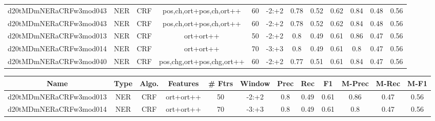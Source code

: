 \documentclass[a4paper]{article}
\begin{document}
\begin{landscape}
\begin{center}
\begin{tabular}{ |c|c|c|c|c|c|c|c|c|c|c|c|}
 	
 
 	
 		
 		\small{ d20tMDmNERaCRFw3mod043 } & NER & CRF & pos,ch,ort+pos,ch,ort++  &  60 &  -2:+2  &  0.78 & 0.52 & 0.62  &  0.84 & 0.48 & 0.56 \\
 		

 	
 
 	
 		
 		\small{ d20tMDmNERaCRFw3mod043 } & NER & CRF & pos,ch,ort+pos,ch,ort++  &  60 &  -2:+2  &  0.78 & 0.52 & 0.62  &  0.84 & 0.48 & 0.56 \\
 		

 	
 
 	
 		
 		\small{ d20tMDmNERaCRFw3mod013 } & NER & CRF & ort+ort++  &  50 &  -2:+2  &  0.8 & 0.49 & 0.61  &  0.86 & 0.47 & 0.56 \\
 		

 	
 
 	
 		
 		\small{ d20tMDmNERaCRFw3mod014 } & NER & CRF & ort+ort++  &  70 &  -3:+3  &  0.8 & 0.49 & 0.61  &  0.8 & 0.47 & 0.56 \\
 		

 	
 
 	
 		
 		\small{ d20tMDmNERaCRFw3mod040 } & NER & CRF & pos,chg,ort+pos,chg,ort++  &  60 &  -2:+2  &  0.77 & 0.51 & 0.61  &  0.84 & 0.47 & 0.56 \\
 		
 \hline
\end{tabular}
\end{center}




\begin{center}
\begin{tabular}{ |c|c|c|c|c|c|c|c|c|c|c|c|} 
 \hline
 	Name & Type & Algo. & Features & \# Ftrs & Window & Prec & Rec & F1 & M-Prec & M-Rec & M-F1\\
 \hline

 		

 	
 
 	
 		
 		\small{ d20tMDmNERaCRFw3mod013 } & NER & CRF & ort+ort++  &  50 &  -2:+2  &  0.8 & 0.49 & 0.61  &  0.86 & 0.47 & 0.56 \\
 		

 	
 
 	
 		
 		\small{ d20tMDmNERaCRFw3mod014 } & NER & CRF & ort+ort++  &  70 &  -3:+3  &  0.8 & 0.49 & 0.61  &  0.8 & 0.47 & 0.56 \\
 		


\end{tabular}
\end{center}
\end{landscape}
\end{document}
